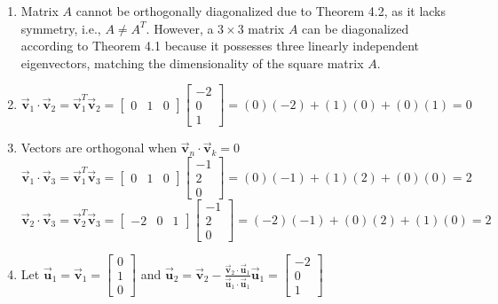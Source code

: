 \documentclass[letter,11pt]{article}
\theoremstyle{definition}
\newcommand{\vvec}{\vec{\boldsymbol{v}}}
\newcommand{\uvec}{\vec{\boldsymbol{u}}}
\begin{document}
\begin{tcolorbox}[boxrule=1mm,enhanced jigsaw, breakable,before=\hfill,after=\hfill,adjusted title={Problem 4 solutions}]
    \begin{enumerate}[label = \alph*.)]
        \item Matrix \( A \) cannot be orthogonally diagonalized due to Theorem 4.2, as it lacks symmetry, i.e., \( A \neq A^T \). However, a \( 3 \times 3 \) matrix \( A \) can be diagonalized according to Theorem 4.1 because it possesses three linearly independent eigenvectors, matching the dimensionality of the square matrix \( A \).
        \item 
        $$\vvec_{1} \cdot \vvec_{2} = \vvec_{1}^{T}\vvec_{2} = \begin{bmatrix}0& 1& 0 \end{bmatrix}\begin{bmatrix}-2\\ 0\\ 1 \end{bmatrix} = (0)(-2)+(1)(0)+(0)(1) = 0 $$
        \item Vectors are orthogonal when $\vvec_{n} \cdot \vvec_{k} = 0$
        $$\vvec_{1} \cdot \vvec_{3} = \vvec_{1}^{T}\vvec_{3} = \begin{bmatrix}0& 1& 0 \end{bmatrix}\begin{bmatrix}-1\\ 2\\ 0 \end{bmatrix} = (0)(-1)+(1)(2)+(0)(0) = 2 $$
        $$\vvec_{2} \cdot \vvec_{3} = \vvec_{2}^{T}\vvec_{3} = \begin{bmatrix}-2& 0& 1 \end{bmatrix}\begin{bmatrix}-1\\ 2\\ 0 \end{bmatrix} = (-2)(-1)+(0)(2)+(1)(0) = 2 $$
        \item Let $\uvec_{1} = \vvec_{1} = \begin{bmatrix}0\\ 1\\ 0 \end{bmatrix}$ and $\uvec_{2} = \vvec_{2} - \frac{\vvec_{2} \cdot \uvec_{1}}{\uvec_{1} \cdot \uvec_{1}} \uvec_{1}= \begin{bmatrix}-2\\ 0\\ 1 \end{bmatrix}$

\end{enumerate}
\end{tcolorbox}
\end{document}
